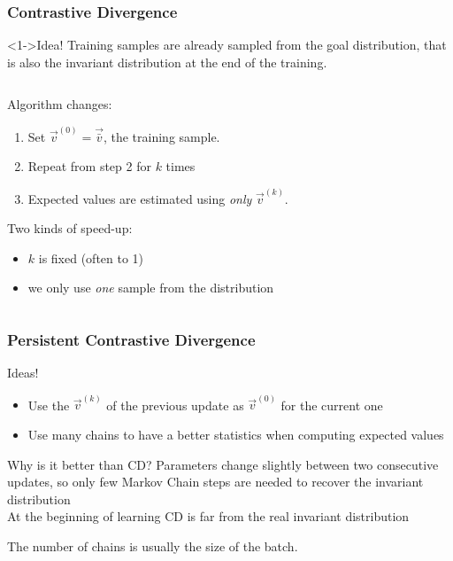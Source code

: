 \begin{frame}
  \frametitle{Contrastive Divergence}
  \begin{alertblock}<1->{Idea!}
    Training samples are already sampled from the goal distribution, that is also the invariant distribution at the end of the training.\\
  \end{alertblock}
  \vspace{20pt}
  \begin{columns}
    \begin{column}{0.66\textwidth}
    	\onslide<2->
      Algorithm changes:
      \begin{enumerate}
        \item Set \(\vec{v}^{(0)} = \vec{\bar{v}}\), the training  sample.
        \addtocounter{enumi}{2}
        \item Repeat from step 2 for \alert{\(k\) times}
        \item Expected values are estimated using \emph{only} \(\vec{v}^{(k)}\).
      \end{enumerate}
      Two kinds of speed-up:
      \begin{itemize}
        \item \(k\) is fixed (often to 1)
        \item we only use \emph{one} sample from the distribution
      \end{itemize}
    \end{column}
    \begin{column}{0.32\textwidth}
    \end{column}
  \end{columns}
\end{frame}

\begin{frame}
  \frametitle{Persistent Contrastive Divergence}
  \begin{alertblock}{Ideas!}
    \begin{itemize}
      \item Use the \(\vec{v}^{(k)}\) of the previous update as \(\vec{v}^{(0)}\) for the current one
      \item Use many chains to have a better statistics  when computing expected values
    \end{itemize}
  \end{alertblock}
	\pause
  \begin{alertblock}{Why is it better than CD?}
     Parameters change slightly between two consecutive updates, so only few Markov Chain steps are needed to recover the invariant distribution \\
     At the beginning of learning CD is far from the real invariant distribution 
  \end{alertblock}
	The number of chains is usually the size of the batch.
\end{frame}

